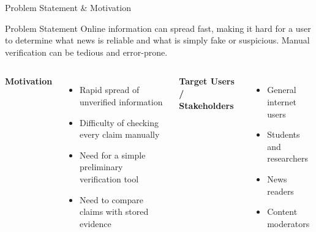 \documentclass[aspectratio=169,10pt]{beamer}
\def\tightlistspacing{%
  \setlength{\itemsep}{1.2pt}%
  \setlength{\parsep}{0pt}%
  \setlength{\topsep}{1pt}%
  \setlength{\partopsep}{0pt}%
}
\begin{document}
\begin{frame}{Problem Statement \& Motivation}
\begin{block}{Problem Statement}
\scriptsize\RaggedRight
Online information can spread fast, making it hard for a user to determine what news is reliable and what is simply fake or suspicious.
Manual verification can be tedious and error-prone.
\end{block}

\vspace{1.5mm}
\begin{columns}[T,totalwidth=\textwidth]
\textbf{\color{GEUBlue}\footnotesize Motivation}
\begin{itemize}\scriptsize\tightlistspacing
\item Rapid spread of unverified information
\item Difficulty of checking every claim manually
\item Need for a simple preliminary verification tool
\item Need to compare claims with stored evidence
\end{itemize}

\textbf{\color{GEUBlue}\footnotesize Target Users / Stakeholders}
\begin{itemize}\scriptsize\tightlistspacing
\item General internet users
\item Students and researchers
\item News readers
\item Content moderators
\end{itemize}
\end{columns}
\end{frame}
\end{document}
